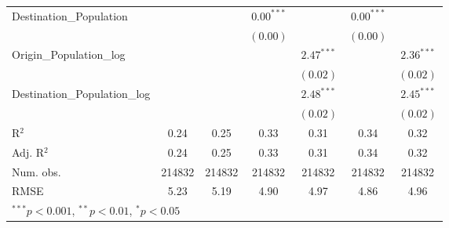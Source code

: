 \begin{table}
\begin{center}
\begin{tabular}{l c c c c c c }
Destination\_Population      &               &               & $0.00^{***}$  &                & $0.00^{***}$  &                \\
&               &               & $(0.00)$      &                & $(0.00)$      &                \\
Origin\_Population\_log      &               &               &               & $2.47^{***}$   &               & $2.36^{***}$   \\
&               &               &               & $(0.02)$       &               & $(0.02)$       \\
Destination\_Population\_log &               &               &               & $2.48^{***}$   &               & $2.45^{***}$   \\
&               &               &               & $(0.02)$       &               & $(0.02)$       \\
			\hline
R$^2$                        & 0.24          & 0.25          & 0.33          & 0.31           & 0.34          & 0.32           \\
Adj. R$^2$                   & 0.24          & 0.25          & 0.33          & 0.31           & 0.34          & 0.32           \\
Num. obs.                    & 214832        & 214832        & 214832        & 214832         & 214832        & 214832         \\
RMSE                         & 5.23          & 5.19          & 4.90          & 4.97           & 4.86          & 4.96           \\
			\hline
			\multicolumn{7}{l}{\scriptsize{$^{***}p<0.001$, $^{**}p<0.01$, $^*p<0.05$}}
		\end{tabular}

		\label{table:GravityModel2013Q4}
	\end{center}
\end{table}

